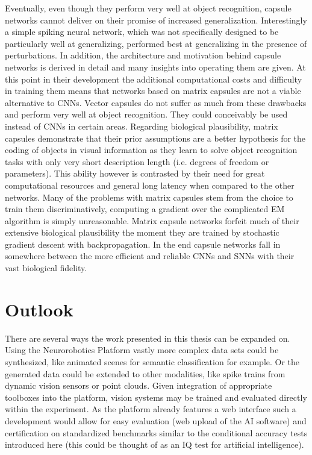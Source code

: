 Eventually, even though they perform very well at object recognition, capsule networks cannot deliver on their promise of increased generalization. Interestingly a simple spiking neural network, which was not specifically designed to be particularly well at generalizing, performed best at generalizing in the presence of perturbations. In addition, the architecture and motivation behind capsule networks is derived in detail and many insights into operating them are given. At this point in their development the additional computational costs and difficulty in training them means that networks based on matrix capsules are not a viable alternative to CNNs. Vector capsules do not suffer as much from these drawbacks and perform very well at object recognition. They could conceivably be used instead of CNNs in certain areas. Regarding biological plausibility, matrix capsules demonstrate that their prior assumptions are a better hypothesis for the coding of objects in visual information as they learn to solve object recognition tasks with only very short description length (i.e. degrees of freedom or parameters). This ability however is contrasted by their need for great computational resources and general long latency when compared to the other networks. Many of the problems with matrix capsules stem from the choice to train them discriminatively, computing a gradient over the complicated EM algorithm is simply unreasonable. Matrix capsule networks forfeit much of their extensive biological plausibility the moment they are trained by stochastic gradient descent with backpropagation. In the end capsule networks fall in somewhere between the more efficient and reliable CNNs and SNNs with their vast biological fidelity.
\section{Outlook}
There are several ways the work presented in this thesis can be expanded on. Using the Neurorobotics Platform vastly more complex data sets could be synthesized, like animated scenes for semantic classification for example. Or the generated data could be extended to other modalities, like spike trains from dynamic vision sensors or point clouds. Given integration of appropriate toolboxes into the platform, vision systems may be trained and evaluated directly within the experiment. As the platform already features a web interface such a development would allow for easy evaluation (web upload of the AI software) and certification on standardized benchmarks similar to the conditional accuracy tests introduced here (this could be thought of as an IQ test for artificial intelligence).

